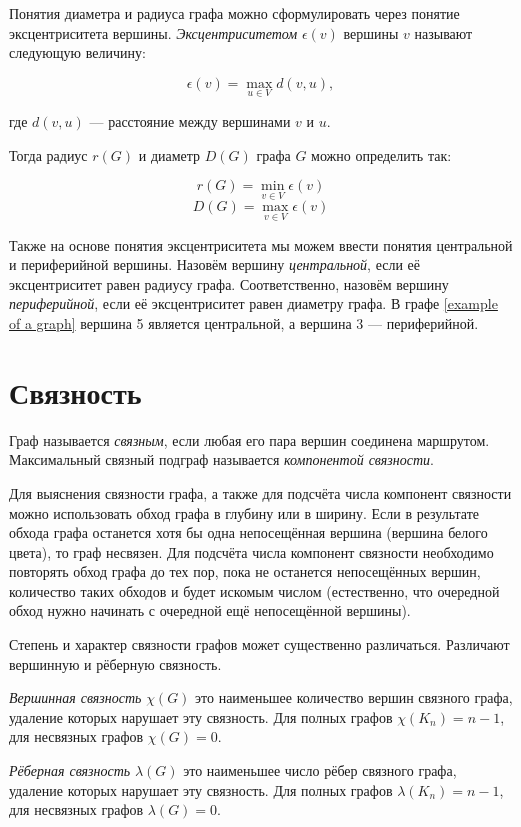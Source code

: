 Понятия диаметра и радиуса графа можно сформулировать через понятие 
эксцентриситета вершины. \emph{Эксцентриситетом} $\epsilon (v)$ вершины $v$ 
называют следующую величину:

\[\epsilon (v) = \max_{u \in V} d(v,u),\]

где $d(v,u)$ --- расстояние между вершинами $v$ и $u$.

Тогда радиус $r(G)$ и диаметр $D(G)$ графа $G$ можно определить так:

\[r(G) = \min_{v \in V}\epsilon (v)\]
\[D(G) = \max_{v \in V}\epsilon (v)\]

Также на основе понятия эксцентриситета мы можем ввести понятия центральной и 
периферийной вершины. Назовём вершину \emph{центральной}, если её 
эксцентриситет равен радиусу графа. Соответственно, назовём вершину 
\emph{периферийной}, если её эксцентриситет равен диаметру графа. В графе 
\ref{example of a graph} вершина 5 является центральной, а вершина 3 --- 
периферийной.

\section{Связность}

Граф называется \emph{связным}, если любая его пара вершин соединена маршрутом.
Максимальный связный подграф называется \emph{компонентой связности}.

Для выяснения связности графа, а также для подсчёта числа компонент связности 
можно использовать обход графа в глубину или в ширину. Если в результате обхода 
графа останется хотя бы одна непосещённая вершина (вершина белого цвета), то 
граф несвязен. Для подсчёта числа компонент связности необходимо повторять 
обход графа до тех пор, пока не останется непосещённых вершин, количество таких 
обходов и будет искомым числом (естественно, что очередной обход нужно начинать 
с очередной ещё непосещённой вершины).

Степень и характер связности графов может существенно различаться. Различают
вершинную и рёберную связность.

\emph{Вершинная связность} $\chi(G)$ это наименьшее количество вершин связного 
графа, удаление которых нарушает эту связность. Для полных графов 
$\chi(K_n)=n-1$, для несвязных графов $\chi(G)=0$.

\emph{Рёберная связность} $\lambda(G)$ это наименьшее число рёбер связного 
графа, удаление которых нарушает эту связность. Для полных графов 
$\lambda(K_n)=n-1$, для несвязных графов $\lambda(G)=0$.

